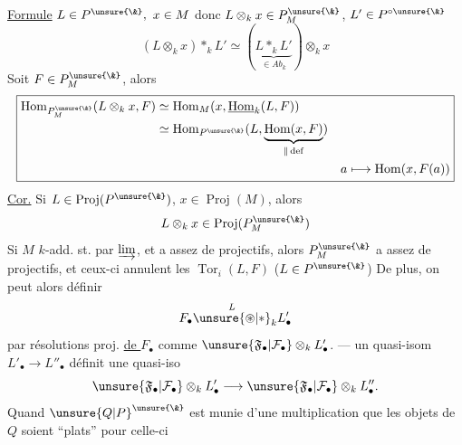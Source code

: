 \uline{Formule} $L\in P^{\unsure{\&}},\ x\in M$ donc $L\otimes_kx\in P_M^{\unsure{\&}}$,
$L'\in P^{\circ\unsure{\&}}$
\[
\boxed{(L\otimes_kx)*_kL'\simeq
(\underbrace{L*_kL'}_{\in Ab_k})\otimes_kx}
\]
Soit $F\in P_M^{\unsure{\&}}$, alors
\[
\boxed{\begin{aligned}
\mathrm{Hom}_{P_M^{\unsure{\&}}}(L\otimes_kx,F)
&\simeq\mathrm{Hom}_M(x,\underline{\mathrm{Hom}}_k(L,F))\\
&\simeq\mathrm{Hom}_{P^{\unsure{\&}}}(L,
\underbrace{\mathrm{Hom}(x,F)}_{\parallel\,\mathrm{def}})\\
&&a\longmapsto\mathrm{Hom}(x,F(a))
\end{aligned}}
\]
\uline{Cor.} Si $L\in\operatorname{Proj}(P^{\unsure{\&}})$, $x\in\operatorname{Proj}(M)$, alors
\[
L\otimes_kx\in\operatorname{Proj}(P_M^{\unsure{\&}})
\]
 Si $M$ $k$-add. st. par $\varinjlim$, et a assez de projectifs,
alors $P_M^{\unsure{\&}}$ a assez de projectifs, et ceux-ci annulent les
$\operatorname{Tor}_i(L,F)$ ($L\in P^{\unsure{\&}}$)
De plus, on peut alors définir
\[
F_\bullet\overset{L}{\unsure{\circledast|*}}_kL'_\bullet
\]
par résolutions proj. \uline{de $F_\bullet$} comme
$\unsure{\mathfrak F_\bullet|\mathcal F_\bullet}\otimes_kL'_\bullet$.
--- un quasi-isom $L'_\bullet\to L''_\bullet$ définit une quasi-iso
\[
\unsure{\mathfrak F_\bullet|\mathcal F_\bullet}\otimes_kL'_\bullet
\longrightarrow
\unsure{\mathfrak F_\bullet|\mathcal F_\bullet}\otimes_kL''_\bullet.
\]
Quand $\unsure{Q|P}^{\unsure{\&}}$ est munie d'une multiplication
 que les objets de $Q$ soient ``plats'' pour celle-ci


